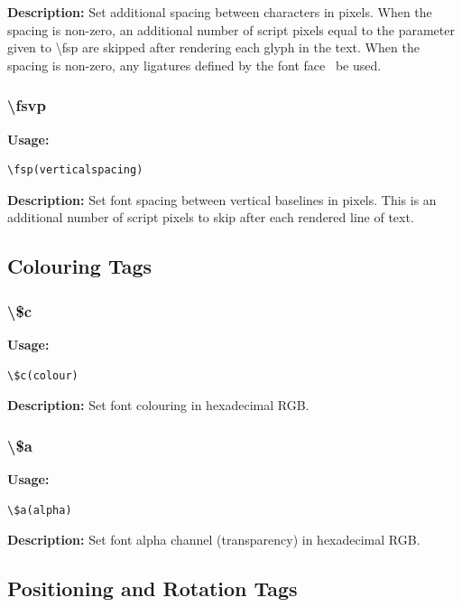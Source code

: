 \documentclass{spec}
\begin{document}
\textbf{Description:}
Set additional spacing between characters in pixels. When the spacing is non-zero, an additional
number of script pixels equal to the parameter given to \textbackslash fsp are skipped after rendering
each glyph in the text. When the spacing is non-zero, any ligatures defined by the font face
\mustnot\ be used.


\subsubsection{\textbackslash fsvp}
\textbf{Usage:}
\begin{verbatim}
\fsp(verticalspacing)
\end{verbatim}

\textbf{Description:}
Set font spacing between vertical baselines in pixels. This is an additional number of script pixels
to skip after each rendered line of text.


\subsection{Colouring Tags}

\subsubsection{\textbackslash \$c}
\textbf{Usage:}
\begin{verbatim}
\$c(colour)
\end{verbatim}

\textbf{Description:}
Set font colouring in hexadecimal RGB.

\subsubsection{\textbackslash \$a}
\textbf{Usage:}
\begin{verbatim}
\$a(alpha)
\end{verbatim}

\textbf{Description:}
Set font alpha channel (transparency) in hexadecimal RGB.

\subsection{Positioning and Rotation Tags}
\end{document}
